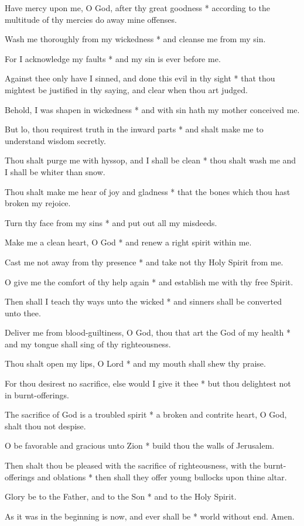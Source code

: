 \begin{multicols}{2}
	Have mercy upon me, O God, after thy great goodness * according to the multitude of thy mercies do away mine offenses.
	
	Wash me thoroughly from my wickedness * and cleanse me from my sin.
	
	For I acknowledge my faults * and my sin is ever before me.
	
	Against thee only have I sinned, and done this evil in thy sight * that thou mightest be justified in thy saying, and clear when thou art judged.
	
	Behold, I was shapen in wickedness * and with sin hath my mother conceived me.
	
	But lo, thou requirest truth in the inward parts * and shalt make me to understand wisdom secretly.
	
	Thou shalt purge me with hyssop, and I shall be clean * thou shalt wash me and I shall be whiter than snow.
	
	Thou shalt make me hear of joy and gladness * that the bones which thou hast broken my rejoice.
	
	Turn thy face from my sins * and put out all my misdeeds.
	
	Make me a clean heart, O God * and renew a right spirit within me.
	
	Cast me not away from thy presence * and take not thy Holy Spirit from me.
	
	O give me the comfort of thy help again * and establish me with thy free Spirit.
	
	Then shall I teach thy ways unto the wicked * and sinners shall be converted unto thee.
	
	Deliver me from blood-guiltiness, O God, thou that art the God of my health * and my tongue shall sing of thy righteousness.
	
	Thou shalt open my lips, O Lord * and my mouth shall shew thy praise.
	
	For thou desirest no sacrifice, else would I give it thee * but thou delightest not in burnt-offerings.
	
	The sacrifice of God is a troubled spirit * a broken and contrite heart, O God, shalt thou not despise.
	
	O be favorable and gracious unto Zion * build thou the walls of Jerusalem.
	
	Then shalt thou be pleased with the sacrifice of righteousness, with the burnt-offerings and oblations * then shall they offer young bullocks upon thine altar.
	
	Glory be to the Father, and to the Son * and to the Holy Spirit.
	
	As it was in the beginning is now, and ever shall be * world without end. Amen.
\end{multicols}